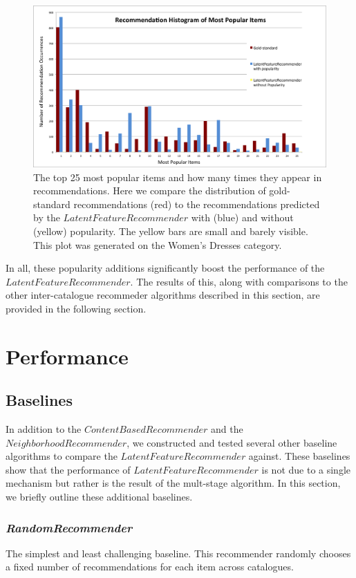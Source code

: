 \documentclass[11pt]{article}
\begin{document}
\begin{figure}[!htbp]
    \centering
    \includegraphics[width=1.0\textwidth]{PopularityHistogram.png}
	\caption{The top 25 most popular items and how many times they appear in
    recommendations. Here we compare the distribution of gold-standard
    recommendations (red) to the recommendations predicted by the
    $LatentFeatureRecommender$ with (blue) and without (yellow) popularity. The
    yellow bars are small and barely visible. This plot was generated on the
    Women's Dresses category.}
    \label{fig:PopularityHistogram}
\end{figure}

In all, these popularity additions significantly boost the performance of the
\linebreak $LatentFeatureRecommender$. The results of this, along with
comparisons to the other inter-catalogue  recommeder algorithms described in
this section, are provided in the following section.

\section*{Performance}
\subsection*{Baselines}
In addition to the $ContentBasedRecommender$ and the $NeighborhoodRecommender$,
we constructed and tested several other baseline algorithms to compare the
$LatentFeatureRecommender$ against. These baselines show that the performance of
$LatentFeatureRecommender$ is not due to a single mechanism but rather is the
result of the mult-stage algorithm. In this section, we briefly outline these
additional baselines.

\subsubsection*{\em RandomRecommender}
The simplest and least challenging baseline. This recommender randomly chooses a
fixed number of recommendations for each item across catalogues.
\end{document}

